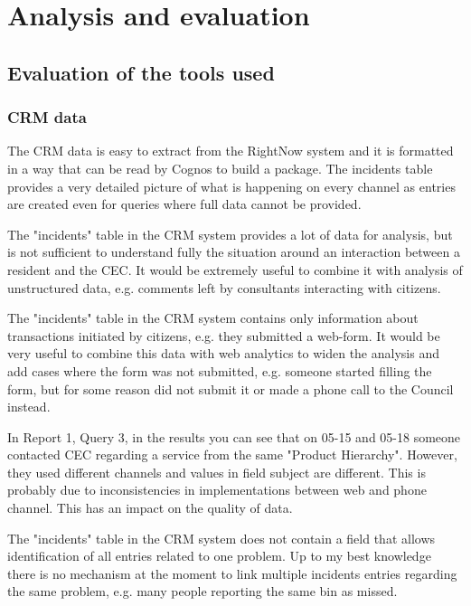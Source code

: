 
\chapter{Analysis and evaluation}
	\section{Evaluation of the tools used}

		\subsection{CRM data}
		
The CRM data is easy to extract from the RightNow system and it is formatted in a way that can be read by Cognos to build a package. The incidents table provides a very detailed picture of what is happening on every channel as entries are created even for queries where full data cannot be provided.

The "incidents" table in the CRM system provides a lot of data for analysis, but is not sufficient to understand fully the situation around an interaction between a resident and the CEC. It would be extremely useful to combine it with analysis of unstructured data, e.g. comments left by consultants interacting with citizens.

The "incidents" table in the CRM system contains only information about transactions initiated by citizens, e.g. they submitted a web-form. It would be very useful to combine this data with web analytics to widen the analysis and add cases where the form was not submitted, e.g. someone started filling the form, but for some reason did not submit it or made a phone call to the Council instead.

In Report 1, Query 3, in the results you can see that on 05-15 and 05-18 someone contacted CEC regarding a service from the same "Product Hierarchy". However, they used different channels and values in field subject are different. This is probably due to inconsistencies in implementations between web and phone channel. This has an impact on the quality of data. 

The "incidents" table in the CRM system does not contain a field that allows identification of all entries related to one problem. Up to my best knowledge there is no mechanism at the moment to link multiple incidents entries regarding the same problem, e.g. many people reporting the same bin as missed. 

